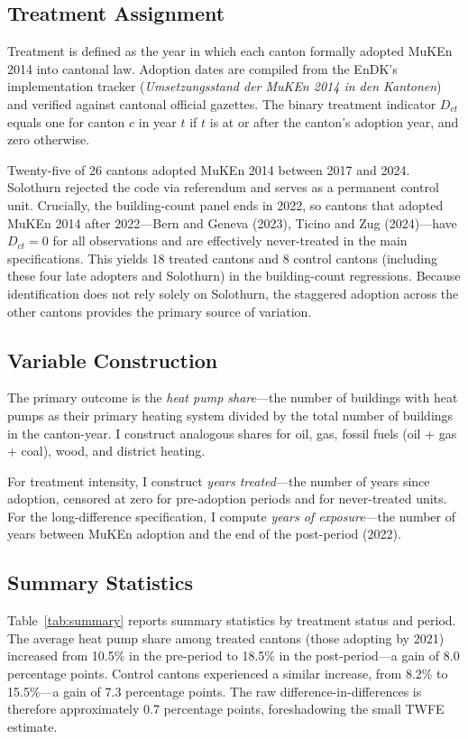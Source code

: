 \documentclass[12pt]{article}
\begin{document}
\subsection{Treatment Assignment}

Treatment is defined as the year in which each canton formally adopted MuKEn 2014 into cantonal law. Adoption dates are compiled from the EnDK's implementation tracker (\textit{Umsetzungsstand der MuKEn 2014 in den Kantonen}) and verified against cantonal official gazettes. The binary treatment indicator $D_{ct}$ equals one for canton $c$ in year $t$ if $t$ is at or after the canton's adoption year, and zero otherwise.

Twenty-five of 26 cantons adopted MuKEn 2014 between 2017 and 2024. Solothurn rejected the code via referendum and serves as a permanent control unit. Crucially, the building-count panel ends in 2022, so cantons that adopted MuKEn 2014 after 2022---Bern and Geneva (2023), Ticino and Zug (2024)---have $D_{ct} = 0$ for all observations and are effectively never-treated in the main specifications. This yields 18 treated cantons and 8 control cantons (including these four late adopters and Solothurn) in the building-count regressions. Because identification does not rely solely on Solothurn, the staggered adoption across the other cantons provides the primary source of variation.

\subsection{Variable Construction}

The primary outcome is the \textit{heat pump share}---the number of buildings with heat pumps as their primary heating system divided by the total number of buildings in the canton-year. I construct analogous shares for oil, gas, fossil fuels (oil + gas + coal), wood, and district heating.

For treatment intensity, I construct \textit{years treated}---the number of years since adoption, censored at zero for pre-adoption periods and for never-treated units. For the long-difference specification, I compute \textit{years of exposure}---the number of years between MuKEn adoption and the end of the post-period (2022).

\subsection{Summary Statistics}

Table~\ref{tab:summary} reports summary statistics by treatment status and period. The average heat pump share among treated cantons (those adopting by 2021) increased from 10.5\% in the pre-period to 18.5\% in the post-period---a gain of 8.0 percentage points. Control cantons experienced a similar increase, from 8.2\% to 15.5\%---a gain of 7.3 percentage points. The raw difference-in-differences is therefore approximately 0.7 percentage points, foreshadowing the small TWFE estimate.
\end{document}
